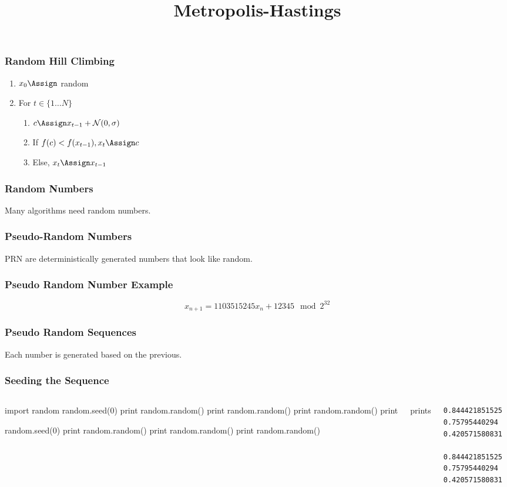 
\title{Metropolis-Hastings}

\frame{\maketitle}

\begin{frame}[fragile]
\frametitle{Random Hill Climbing}
\begin{enumerate}
\item $x_0 \Assign $ random
\item For $t \in \{1 \ldots N \}$
\begin{enumerate}[a]
\item $c \Assign x_{t-1} + \mathcal{N}(0,\sigma)$
\item If $f(c) < f(x_{t-1}), x_t \Assign c$
\item Else, $x_t \Assign x_{t-1}$
\end{enumerate}
\end{enumerate}
\end{frame}

\begin{frame}[fragile]
\frametitle{Random Numbers}
Many algorithms need random numbers.
\end{frame}

\begin{frame}[fragile]
\frametitle{Pseudo-Random Numbers}
PRN are deterministically generated numbers that look like random.
\end{frame}

\begin{frame}[fragile]
\frametitle{Pseudo Random Number Example}

\[
x_{n+1} = 1103515245 x_n + 12345 \mod 2^{32}
\]

\end{frame}

\begin{frame}[fragile]
\frametitle{Pseudo Random Sequences}

Each number is generated based on the previous.

\end{frame}

\begin{frame}[fragile]
\frametitle{Seeding the Sequence}
\begin{columns}
\begin{python}
import random
random.seed(0)
print random.random()
print random.random()
print random.random()
print 

random.seed(0)
print random.random()
print random.random()
print random.random()
\end{python}
prints
\begin{verbatim}
0.844421851525
0.75795440294
0.420571580831

0.844421851525
0.75795440294
0.420571580831
\end{verbatim}

\end{columns}
\end{frame}

